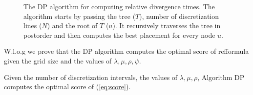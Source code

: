 \documentclass{llncs}
\begin{document}
\begin{figure}[t]
\begin{center}
\begin{tabular}{|rl|}
\hline  
\end{tabular}
\end{center}
\caption{The DP algorithm for computing relative divergence times. The
algorithm starts by passing the tree ($T$), number of discretization lines
($N$) and the root of $T$ ($u$). It recursively traverses the tree in
postorder and then computes the best placement for every node $u$.}
\label{fig:dp}
\end{figure}

W.l.o.g we prove that the DP algorithm computes the optimal score of
ref{formula} given the grid size and the values of $\lambda,\mu,\rho,\psi$.

\begin{theorem}[Optimality of DP]
Given the number of discretization intervals, the values of $\lambda,\mu,\rho$,
Algorithm DP computes the optimal score of (\ref{eq:score}).
\end{theorem}
\end{document}
